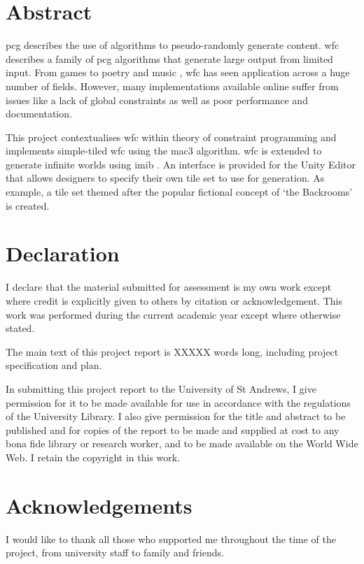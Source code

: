 \section*{Abstract}
\acrfull{pcg} describes the use of algorithms to pseudo-randomly generate content. \acrfull{wfc} describes a family of \acrshort{pcg} algorithms that generate large output from limited input. From games \cite{townscaper,badnorth,cavesofqud} to poetry \cite{WFC_poetry} and music \cite{WFC_music,WFC_music_2}, \acrshort{wfc} has seen application across a huge number of fields. However, many implementations available online suffer from issues like a lack of global constraints as well as poor performance and documentation.

This project contextualises \acrshort{wfc} within theory of constraint programming and implements simple-tiled \acrshort{wfc} using the \acrlong{mac3} algorithm. \acrshort{wfc} is extended to generate infinite worlds using \acrfull{imib} \cite{Infinite_Modifying_In_Blocks}. An interface is provided for the Unity Editor that allows designers to specify their own tile set to use for generation. As example, a tile set themed after the popular fictional concept of `the Backrooms' is created.


\section*{Declaration}
I declare that the material submitted for assessment is my own work except where credit is explicitly given to others by citation or acknowledgement. This work was performed during the current academic year except where otherwise stated.
\par \vspace{\baselineskip}
The main text of this project report is XXXXX words
long, including project specification and plan.
\par \vspace{\baselineskip}
In submitting this project report to the University of St
Andrews, I give permission for it to be made available
for use in accordance with the regulations of the University
Library. I also give permission for the title and abstract
to be published and for copies of the report to be made and
supplied at cost to any bona fide library or research worker,
and to be made available on the World Wide Web. I retain the copyright in this work.

\section*{Acknowledgements}
I would like to thank all those who supported me throughout the time of the project, from university staff to family and friends.